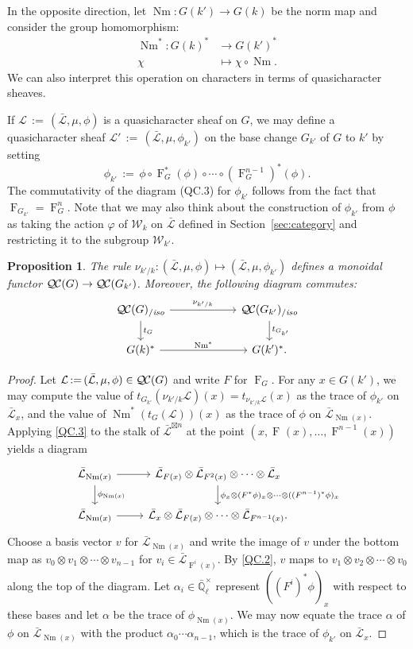 \documentclass[11pt]{amsart}
\theoremstyle{plain}
\newtheorem{proposition}[theorem]{Proposition}
\theoremstyle{definition}
\theoremstyle{remark}
\newcommand{\EE}{\mathbb{\bar Q}_\ell}
\newcommand{\EEx}{\EE^\times}
\newcommand{\Frob}[1]{\operatorname{F}_{#1}}
\DeclareMathOperator{\Nm}{Nm}
\newcommand{\ceq}{{\, :=\, }}
\newcommand{\qcs}[1]{{\mathcal{#1}}}
\newcommand{\gqcs}[1]{{\mathcal{\bar #1}}}
\newcommand{\QC}{{\mathcal{Q\hskip-0.8pt C}}}
\newcommand{\QCiso}[1]{\QC(#1)_{/\textit{iso}}}
\newcommand{\Weil}[1]{\mathcal{W}_{#1}}
\newcommand{\trFrob}[1]{t_{#1}}
\begin{document}
In the opposite direction, let $\Nm : G(k') \to G(k)$ be the norm map and consider the group homomorphism:
\begin{align*}
\Nm^* : G(k)^* &\to G(k')^* \\
\chi &\mapsto \chi\circ \Nm.
\end{align*}
We can also interpret this operation on characters in terms of quasicharacter sheaves.

If $\qcs{L} \ceq (\gqcs{L}, \mu, \phi)$ is a quasicharacter sheaf on $G$, we may define
a quasicharacter sheaf $\qcs{L}' \ceq (\gqcs{L}, \mu, \phi_{k'})$ on the base change
$G_{k'}$ of $G$ to $k'$ by setting
\[
\phi_{k'} \ceq \phi \circ \Frob{G}^*(\phi) \circ \cdots \circ (\Frob{G}^{n-1})^*(\phi).
\]
The commutativity of the diagram (QC.3) for $\phi_{k'}$ 
follows from the fact that $\Frob{G_{k'}} = \Frob{G}^n$.
Note that we may also think about the construction of $\phi_{k'}$ from $\phi$
as taking the action $\varphi$ of $\Weil{k}$ on $\gqcs{L}$ 
defined in Section~\ref{sec:category} and restricting it to the subgroup $\Weil{k'}$.

\begin{proposition}\label{prop:basechange}
 The rule $\nu_{k'/k}: (\gqcs{L}, \mu, \phi) \mapsto (\gqcs{L}, \mu, \phi_{k'})$ 
 defines a monoidal functor $\QC(G) \to \QC(G_{k'})$. 
 Moreover, the following diagram commutes:
\[
\begin{tikzcd}[column sep=60]
\QCiso{G} \rar{\nu_{k'/k}} \dar{\trFrob{G}} & \QCiso{G_{k'}} \dar{\trFrob{G_{k'}}} \\
G(k)^*  \rar{\Nm^*} & G(k')^*.
\end{tikzcd}
\]
\end{proposition}
\begin{proof}
Let $\qcs{L} \ceq (\gqcs{L}, \mu, \phi) \in \QC(G)$ and write $F$ for $\Frob{G}$.  For any $x \in G(k')$,
we may compute the value of $t_{G_{k'}}(\nu_{k'/k}\qcs{L})(x)= t_{\nu_{k'/k}\qcs{L}}(x)$ as the trace of $\phi_{k'}$ on $\gqcs{L}_x$,
and the value of $\Nm^*(t_G(\qcs{L}))(x)$ as the trace of $\phi$ on $\gqcs{L}_{\Nm(x)}$.
Applying \ref{QC.3} to the stalk of $\gqcs{L}^{\boxtimes n}$ at the point $(x, \Frob{}(x), \ldots, \Frob{}^{n-1}(x))$ yields a diagram
\[
\begin{tikzcd}
\gqcs{L}_{\Nm(x)} \rar \dar{\phi_{\Nm(x)}} & \gqcs{L}_{F(x)} \otimes \gqcs{L}_{F^2(x)} \otimes \cdots \otimes \gqcs{L}_x
\dar{\phi_x \otimes (F^*\phi)_x \otimes \cdots \otimes ((F^{n-1})^*\phi)_x} \\
\gqcs{L}_{\Nm(x)} \rar & \gqcs{L}_x \otimes \gqcs{L}_{F(x)} \otimes \cdots \otimes \gqcs{L}_{F^{n-1}(x)}.
\end{tikzcd}
\]
Choose a basis vector $v$ for $\gqcs{L}_{\Nm(x)}$ and write the image of $v$ under the
bottom map as $v_0 \otimes v_1 \otimes \cdots \otimes v_{n-1}$
for $v_i \in \gqcs{L}_{\Frob{}^i(x)}$.  By \ref{QC.2}, $v$ maps to
$v_1 \otimes v_2 \otimes \cdots \otimes v_0$ along the top of the diagram.
Let $\alpha_i \in \EEx$ represent $((F^i)^*\phi)_x$ with respect to these bases and let $\alpha$ be
the trace of $\phi_{\Nm(x)}$.  We may now equate the trace $\alpha$ of $\phi$ on $\gqcs{L}_{\Nm(x)}$
with the product $\alpha_0 \cdots \alpha_{n-1}$, which is the trace of $\phi_{k'}$ on $\gqcs{L}_x$.
\end{proof}
\end{document}
